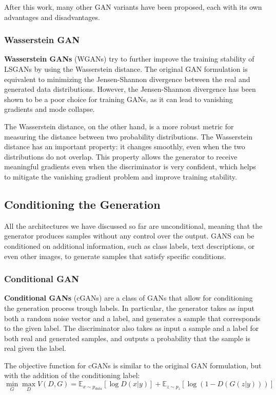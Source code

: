 After this work, many other GAN variants have been proposed, each with its own advantages and disadvantages.

\subsubsection{Wasserstein GAN}
\textbf{Wasserstein GANs} (WGANs) try to further improve the training stability of LSGANs by using the Wasserstein distance. 
The original GAN formulation is equivalent to minimizing the Jensen-Shannon divergence between the real and generated data distributions.
However, the Jensen-Shannon divergence has been shown to be a poor choice for training GANs, as it can lead to vanishing gradients and mode collapse.

The Wasserstein distance, on the other hand, is a more robust metric for measuring the distance between two probability distributions.
The Wasserstein distance has an important property: it changes smoothly, even when the two distributions do not overlap.
This property allows the generator to receive meaningful gradients even when the discriminator is very confident, which helps to mitigate the vanishing gradient problem and improve training stability.

\subsection{Conditioning the Generation}
All the architectures we have discussed so far are unconditional, meaning that the generator produces samples without any control over the output.
GANS can be conditioned on additional information, such as class labels, text descriptions, or even other images, to generate samples that satisfy specific conditions.

\subsubsection{Conditional GAN}
\textbf{Conditional GANs} (cGANs) are a class of GANs that allow for conditioning the generation process trough labels.
In particular, the generator takes as input both a random noise vector and a label, and generates a sample that corresponds to the given label.
The discriminator also takes as input a sample and a label for both real and generated samples, and outputs a probability that the sample is real given the label.

The objective function for cGANs is similar to the original GAN formulation, but with the addition of the conditioning label:
\begin{equation}
    \min_G \max_D V(D, G) = \mathbb{E}_{x \sim p_{data}}[\log D(x | y)] + \mathbb{E}_{z \sim p_z}[\log(1 - D(G(z | y)))]
\end{equation}

